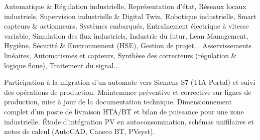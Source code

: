 \documentclass[10pt,a4paper]{../altacv}
\begin{document}
\cvidentite
{}
\makecvheader

\cvformation
{Automatique \& Régulation industrielle, Représentation d’état, Réseaux locaux industriels, Supervision industrielle \& Digital Twin, Robotique industrielle, Smart capteurs \& actionneurs, Systèmes embarqués, Entraînement électrique à vitesse variable, Simulation des flux industriels, Industrie du futur, Lean Management, Hygiène, Sécurité \& Environnement (HSE), Gestion de projet...}
{Asservissements linéaires, Automatismes et capteurs, Synthèse des correcteurs (régulation \& logique floue), Traitement du signal...}

\expmenara
{Participation à la migration d’un automate vers Siemens S7 (TIA Portal) et suivi des opérations de production.}
{Maintenance préventive et corrective sur lignes de production, mise à jour de la documentation technique.}
\vspace{2pt}
\expcore
{Dimensionnement complet d’un poste de livraison HTA/BT et bilan de puissance pour une zone industrielle.}
{Étude d’intégration PV en autoconsommation, schémas unifilaires et notes de calcul (AutoCAD, Caneco BT, PVsyst).}
\end{document}
